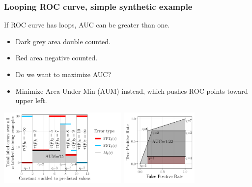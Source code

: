 \documentclass{beamer}
\begin{document}
\begin{frame}
  \frametitle{Looping ROC curve, simple synthetic example}

If ROC curve has loops, AUC can be greater than one.

  \begin{itemize}
  \item Dark grey area double counted.
  \item Red area negative counted.
  \item Do we want to maximize AUC?
  \item Minimize Area Under Min (AUM) instead, which pushes ROC points
    toward upper left.
  \end{itemize}

  \includegraphics[height=1.5in]{figure-more-than-one-more-aum}
  \includegraphics[height=1.5in]{figure-more-than-one-more-auc}

\end{frame}
\end{document}
